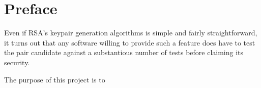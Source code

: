 \chapter{Preface}

Even if RSA's keypair generation algorithms is simple and fairly
straightforward, it turns out that any software willing to provide such a
feature does have to test the pair candidate against a substantious number of
tests before claiming its security.

The purpose of this project is to
